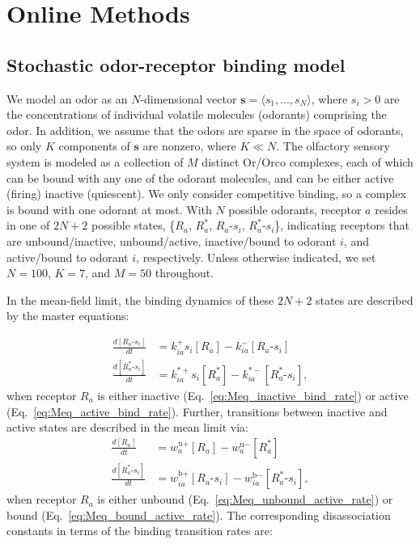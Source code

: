 \section{Online Methods}

\subsection{Stochastic odor-receptor binding model}

We model an odor as an $N$-dimensional vector $\mathbf s = \langle s_1,...,s_N\rangle$, where $s_i > 0$ are the concentrations of individual volatile molecules (odorants) comprising the odor. In addition, we assume that the odors are sparse in the space of odorants, so only $K$ components of $\mathbf s$ are nonzero, where $K \ll N$. The olfactory sensory system is modeled as a collection of $M$ distinct Or/Orco complexes, each of which can be bound with any one of the odorant molecules, and can be either active (firing) inactive (quiescent). We only consider competitive binding, so a complex is bound with one odorant at most. With $N$ possible odorants, receptor $a$ resides in one of $2N+2$ possible states, \{$R_a$, $R^*_a$, $R_a$-$s_i$, $R^*_a$-$s_i$\}, indicating receptors that are unbound/inactive, unbound/active, inactive/bound to odorant $i$, and active/bound to odorant $i$, respectively. Unless otherwise indicated, we set $N = 100$, $K = 7$, and $M = 50$ throughout.

In the mean-field limit, the binding dynamics of these $2N + 2$ states are described by the master equations:

\begin{align}
\frac{d[R_a\text{-}s_i]}{dt} &= k^+_{ia}s_i[R_a] - k^-_{ia}[R_a\text{-}s_i] \label{eq:Meq_inactive_bind_rate}\\
\frac{d[R^*_a\text{-}s_i]}{dt} &= k^{*+}_{ia}s_i[R^*_a] - k^{*-}_{ia}[R^*_a\text{-}s_i],
\label{eq:Meq_active_bind_rate}
\end{align}
when receptor $R_a$ is either inactive (Eq.~\ref{eq:Meq_inactive_bind_rate}) or active (Eq.~\ref{eq:Meq_active_bind_rate}). Further, transitions between inactive and active states are described in the mean limit via:
\begin{align}
\frac{d[R_a]}{dt} &= w^{\text{u}+}_a [R_a] - w^{\text{u}-}_a [R^*_a] \label{eq:Meq_unbound_active_rate}\\
\frac{d[R^*_a\text{-}s_i]}{dt} &=  w^{\text{b}+}_{ia} [R_a\text{-}s_i] - w^{\text{b}-}_{ia}  [R^*_a\text{-}s_i],
\label{eq:Meq_bound_active_rate}
\end{align}
when receptor $R_a$ is either unbound (Eq.~\ref{eq:Meq_unbound_active_rate}) or bound (Eq.~\ref{eq:Meq_bound_active_rate}). The corresponding disassociation constants in terms of the binding transition rates are:


